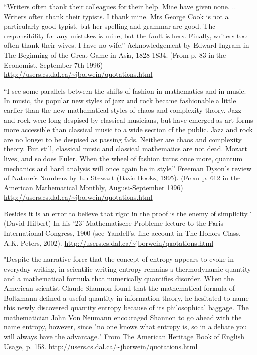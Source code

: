      ``Writers often thank their colleagues for their help. Mine have given none. .. Writers often thank their typists. I thank mine. Mrs George Cook is not a particularly good typist, but her spelling and grammar are good. The responsibility for any mistakes is mine, but the fault is hers. Finally, writers too often thank their wives. I have no wife.'' 
Acknowledgement by Edward Ingram in The Beginning of the Great Game in Asia, 1828-1834.
(From p. 83 in the Economist, September 7th 1996) 
\url{http://users.cs.dal.ca/~jborwein/quotations.html}


     ``I see some parallels between the shifts of fashion in mathematics and in music. In music, the popular new styles of jazz and rock became fashionable a little earlier than the new mathematical styles of chaos and complexity theory. Jazz and rock were long despised by classical musicians, but have emerged as art-forms more accessible than classical music to a wide section of the public. Jazz and rock are no longer to be despised as passing fads. Neither are chaos and complexity theory. But still, classical music and classical mathematics are not dead. Mozart lives, and so does Euler. When the wheel of fashion turns once more, quantum mechanics and hard analysis will once again be in style.'' 
Freeman Dyson's review of Nature's Numbers by Ian Stewart (Basic Books, 1995).
(From p. 612 in the American Mathematical Monthly, August-September 1996) 
\url{http://users.cs.dal.ca/~jborwein/quotations.html}

    Besides it is an error to believe that rigor in the proof is the enemy of simplicity."
(David Hilbert)
In his `23' Mathematische Probleme lecture to the Paris International Congress, 1900 (see Yandell's, fine account in The Honors Class, A.K. Peters, 2002). 
\url{http://users.cs.dal.ca/~jborwein/quotations.html}

     "Despite the narrative force that the concept of entropy appears to evoke in everyday writing, in scientific writing entropy remains a thermodynamic quantity and a mathematical formula that numerically quantifies disorder. When the American scientist Claude Shannon found that the mathematical formula of Boltzmann defined a useful quantity in information theory, he hesitated to name this newly discovered quantity entropy because of its philosophical baggage. The mathematician John Von Neumann encouraged Shannon to go ahead with the name entropy, however, since "no one knows what entropy is, so in a debate you will always have the advantage." 
From The American Heritage Book of English Usage, p. 158. 
\url{http://users.cs.dal.ca/~jborwein/quotations.html}

